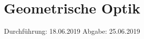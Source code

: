 

\subject{V408}
\title{Geometrische Optik}
\date{%
Durchführung: {18.06.2019}
\hspace{3em}
Abgabe: {25.06.2019}
}



\maketitle
\thispagestyle{empty}
\tableofcontents
\newpage





\printbibliography{}

